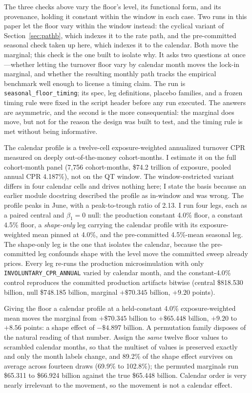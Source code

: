 \documentclass[12pt]{article}
\begin{document}
The three checks above vary the floor's level, its functional form, and its provenance, holding it constant within the window in each case. Two runs in this paper let the floor vary within the window instead: the cyclical variant of Section~\ref{sec:pathb}, which indexes it to the rate path, and the pre-committed seasonal check taken up here, which indexes it to the calendar. Both move the marginal; this check is the one built to isolate why. It asks two questions at once---whether letting the turnover floor vary by calendar month moves the lock-in marginal, and whether the resulting monthly path tracks the empirical benchmark well enough to license a timing claim. The run is \texttt{seasonal\_floor\_timing}; its spec, leg definitions, placebo families, and a frozen timing rule were fixed in the script header before any run executed. The answers are asymmetric, and the second is the more consequential: the marginal does move, but not for the reason the design was built to test, and the timing rule is met without being informative.

The calendar profile is a twelve-cell exposure-weighted annualized turnover CPR measured on deeply out-of-the-money cohort-months. I estimate it on the full cohort-month panel (7{,}756 cohort-months, \$74.2 trillion of exposure, pooled annual CPR 4.187\%), not on the QT window. The window-restricted variant differs in four calendar cells and drives nothing here; I state the basis because an earlier module docstring described the profile as in-window and was wrong. The profile peaks in June, with a peak-to-trough ratio of 2.13. I run four legs, each as a paired central and $\beta_1 = 0$ null: the production constant 4.0\% floor, a constant 4.5\% floor, a \emph{shape-only} leg carrying the calendar profile with its exposure-weighted mean pinned at 4.0\%, and the pre-committed 4.5\%-mean seasonal leg. The shape-only leg is the one that isolates the calendar, because the pre-committed leg confounds shape with the level move the committed sweep already prices. Every leg re-runs the production microsimulation with only \texttt{INVOLUNTARY\_CPR\_ANNUAL} varied by calendar month, and the constant-4.0\% control reproduces the committed production artifacts bitwise (central \$818.530 billion, null \$748.185 billion, marginal $+\$70.345$ billion, $+9.20$ points).

Giving the floor a calendar profile at a held-constant 4.0\% exposure-weighted mean moves the marginal from $+\$70.345$ billion to $+\$65.448$ billion, $+9.20$ to $+8.56$ points: a shape effect of $-\$4.897$ billion. A permutation family disposes of the natural reading of that number. Assign the \emph{same} twelve floor values to scrambled calendar months, so that the multiset of values is preserved exactly and only the month labels change, and 89.2\% of the shape effect survives on average across fourteen draws (69.9\% to 102.8\%); the permuted marginals run \$65.311 to \$66.924 billion against the true \$65.448 billion. Calendar order is very nearly irrelevant to the movement, so the movement is not a calendar effect.
\end{document}
